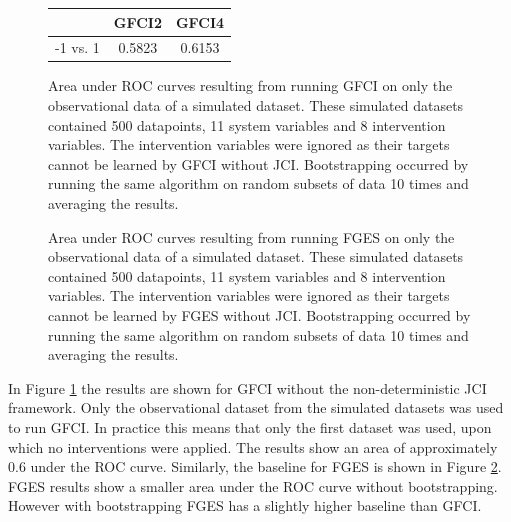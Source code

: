 \documentclass[a4paper,pdf]{article}
\begin{document}
\begin{figure}[!ht]
    \centering   
    \renewcommand{\arraystretch}{2}
    \setlength{\tabcolsep}{7pt}
    \begin{tabular}{|r|c|c|}
        \hline
                 & GFCI2 & GFCI4\\ \hline
        -1 vs. 1 & 0.5823 & 0.6153\\ \hline
    \end{tabular}
    \caption{Area under ROC curves resulting from running GFCI on only the observational data of a simulated dataset. These simulated datasets contained 500 datapoints, 11 system variables and 8 intervention variables. The intervention variables were ignored as their targets cannot be learned by GFCI without JCI. Bootstrapping occurred by running the same algorithm on random subsets of data 10 times and averaging the results.\label{fig:obssimgraphgfci}}

\end{figure}
\newpage %
\begin{figure}[!ht]
    \centering   
    \renewcommand{\arraystretch}{2}
    \setlength{\tabcolsep}{7pt}
    \caption{Area under ROC curves resulting from running FGES on only the observational data of a simulated dataset. These simulated datasets contained 500 datapoints, 11 system variables and 8 intervention variables. The intervention variables were ignored as their targets cannot be learned by FGES without JCI. Bootstrapping occurred by running the same algorithm on random subsets of data 10 times and averaging the results.\label{fig:obssimgraphfges}}

\end{figure}

In Figure \ref{fig:obssimgraphgfci} the results are shown for GFCI without the non-deterministic JCI framework. Only the observational dataset from the simulated datasets was used to run GFCI. In practice this means that only the first dataset was used, upon which no interventions were applied. The results show an area of approximately 0.6 under the ROC curve. Similarly, the baseline for FGES is shown in Figure \ref{fig:obssimgraphfges}. FGES results show a smaller area under the ROC curve without bootstrapping. However with bootstrapping FGES has a slightly higher baseline than GFCI.
\end{document}
